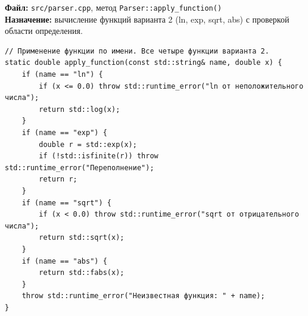 



\noindent\textbf{Файл:} \texttt{src/parser.cpp}, метод \texttt{Parser::apply\_function()}\\
\textbf{Назначение:} вычисление функций варианта 2 (ln, exp, sqrt, abs) с проверкой области определения.

\begin{lstlisting}
// Применение функции по имени. Все четыре функции варианта 2.
static double apply_function(const std::string& name, double x) {
    if (name == "ln") {
        if (x <= 0.0) throw std::runtime_error("ln от неположительного числа");
        return std::log(x);
    }
    if (name == "exp") {
        double r = std::exp(x);
        if (!std::isfinite(r)) throw std::runtime_error("Переполнение");
        return r;
    }
    if (name == "sqrt") {
        if (x < 0.0) throw std::runtime_error("sqrt от отрицательного числа");
        return std::sqrt(x);
    }
    if (name == "abs") {
        return std::fabs(x);
    }
    throw std::runtime_error("Неизвестная функция: " + name);
}
\end{lstlisting}


